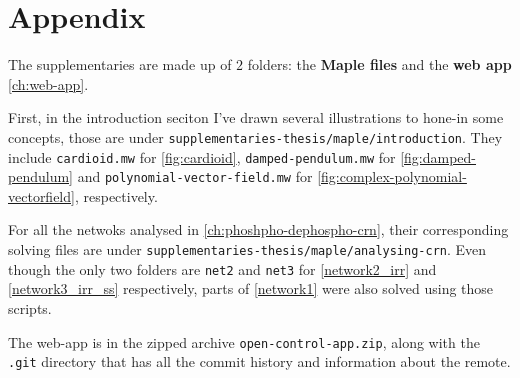 \chapter*{Appendix}\label{appendix}
The supplementaries are made up of $2$ folders: the \textbf{Maple files} and the \textbf{web app} \ref{ch:web-app}.

First, in the introduction seciton I've drawn several illustrations to hone-in some concepts, those are under \verb|supplementaries-thesis/maple/introduction|. They include \verb|cardioid.mw| for \ref{fig:cardioid}, \verb|damped-pendulum.mw| for \ref{fig:damped-pendulum} and \verb|polynomial-vector-field.mw| for \ref{fig:complex-polynomial-vectorfield}, respectively.

For all the netwoks analysed in \ref{ch:phoshpho-dephospho-crn}, their corresponding solving files are under \verb|supplementaries-thesis/maple/analysing-crn|. Even though the only two folders are \verb|net2| and \verb|net3| for \ref{network2_irr} and \ref{network3_irr_ss} respectively, parts of \ref{network1} were also solved using those scripts.

The web-app is in the zipped archive \verb|open-control-app.zip|, along with the \verb|.git| directory that has all the commit history and information about the remote.